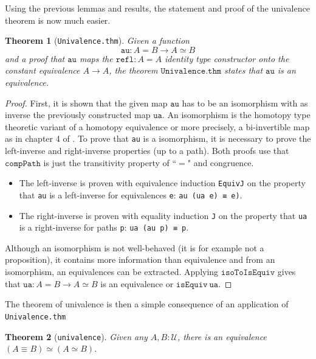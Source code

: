 \documentclass[12pt,a4paper,twoside,xetex]{book} %
\newtheorem{theorem}{Theorem}[section]
\newcommand{\op}[1]{\mathtt{#1}}
\begin{document}
Using the previous lemmas and results, the statement and proof of the 
univalence theorem is now much easier.

\begin{theorem}[\texttt{Univalence.thm}]
Given a function  $$\op{au} : A = B \rightarrow A \simeq B$$ and a proof that 
$\op{au}$ maps the $\op{refl} : A = A$ identity type constructor onto the 
constant equivalence $A \rightarrow A$, the theorem $\op{Univalence.thm}$ 
states that $\op{au}$ is an equivalence.
\end{theorem}

\begin{proof}
First, it is shown that the given map $\op{au}$ has to be an isomorphism with as 
inverse the previously constructed map $\op{ua}$. An isomorphism is the 
homotopy type theoretic variant of a homotopy equivalence or more precisely, a 
bi-invertible map as in chapter 4 of \cite{Voevodsky2013}. To prove that 
\texttt{au} is a isomorphism, it is necessary to prove the left-inverse and 
right-inverse properties (up to a path). Both proofs use that $\op{compPath}$ 
is just the transitivity property of ``$=$" and congruence. 
\begin{itemize}
\item The left-inverse is proven with equivalence induction \texttt{EquivJ} on 
the property that \texttt{au} is a left-inverse for equivalences \texttt{e}: 
\texttt{au (ua e) ≡ e)}. 
\item The right-inverse is proven with equality induction \texttt{J} on the 
property that \texttt{ua} is a right-inverse for paths \texttt{p}: \texttt{ua 
(au p) ≡ p}. 
\end{itemize}
Although an isomorphism is not well-behaved (it is for example not a 
proposition), it contains more information than equivalence and from an 
isomorphism, an equivalences can be extracted. Applying $\op{isoToIsEquiv}$ 
gives that $\op{ua} : A = B \rightarrow A \simeq B$ is an equivalence or 
$\op{isEquiv}\ \op{ua}$. 
\end{proof}

The theorem of univalence is then a simple consequence of an application of 
\texttt{Univalence.thm}

\begin{theorem}[\texttt{univalence}]
Given any $A,B : \mathcal{U}$, there is an equivalence $\left( A \equiv B 
\right) \simeq \left( A \simeq B \right).$
\end{theorem}
\end{document}
